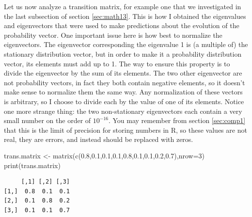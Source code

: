 \documentclass[
  letterpaper,
  DIV=11,
  numbers=noendperiod]{scrreprt}
\newenvironment{Shaded}{\begin{snugshade}}{\end{snugshade}}
\newcommand{\AttributeTok}[1]{\textcolor[rgb]{0.40,0.45,0.13}{#1}}
\newcommand{\DecValTok}[1]{\textcolor[rgb]{0.68,0.00,0.00}{#1}}
\newcommand{\FloatTok}[1]{\textcolor[rgb]{0.68,0.00,0.00}{#1}}
\newcommand{\FunctionTok}[1]{\textcolor[rgb]{0.28,0.35,0.67}{#1}}
\newcommand{\NormalTok}[1]{\textcolor[rgb]{0.00,0.23,0.31}{#1}}
\newcommand{\OtherTok}[1]{\textcolor[rgb]{0.00,0.23,0.31}{#1}}
\newcommand{\SpecialCharTok}[1]{\textcolor[rgb]{0.37,0.37,0.37}{#1}}
\begin{document}
Let us now analyze a transition matrix, for example one that we
investigated in the last subsection of section \ref{sec:math13}. This is
how I obtained the eigenvalues and eigenvectors that were used to make
predictions about the evolution of the probability vector. One important
issue here is how best to normalize the eigenvectors. The eigenvector
corresponding the eigenvalue 1 is (a multiple of) the stationary
distribution vector, but in order to make it a probability distribution
vector, its elements must add up to 1. The way to ensure this property
is to divide the eigenvector by the sum of its elements. The two other
eigenvector are not probability vectors, in fact they both contain
negative elements, so it doesn't make sense to normalize them the same
way. Any normalization of these vectors is arbitrary, so I choose to
divide each by the value of one of its elements. Notice one more strange
thing: the two non-stationary eigenvectors each contain a very small
number on the order of \(10^{-16}\). You may remember from section
\ref{sec:comp1} that this is the limit of precision for storing numbers
in R, so these values are not real, they are errors, and instead should
be replaced with zeros.

\begin{Shaded}
\begin{Highlighting}[]
\NormalTok{trans.matrix }\OtherTok{\textless{}{-}} \FunctionTok{matrix}\NormalTok{(}\FunctionTok{c}\NormalTok{(}\FloatTok{0.8}\NormalTok{,}\FloatTok{0.1}\NormalTok{,}\FloatTok{0.1}\NormalTok{,}\FloatTok{0.1}\NormalTok{,}\FloatTok{0.8}\NormalTok{,}\FloatTok{0.1}\NormalTok{,}\FloatTok{0.1}\NormalTok{,}\FloatTok{0.2}\NormalTok{,}\FloatTok{0.7}\NormalTok{),}\AttributeTok{nrow=}\DecValTok{3}\NormalTok{)}
\FunctionTok{print}\NormalTok{(trans.matrix)}
\end{Highlighting}
\end{Shaded}

\begin{verbatim}
     [,1] [,2] [,3]
[1,]  0.8  0.1  0.1
[2,]  0.1  0.8  0.2
[3,]  0.1  0.1  0.7
\end{verbatim}

\begin{Shaded}
\end{Shaded}
\end{document}
